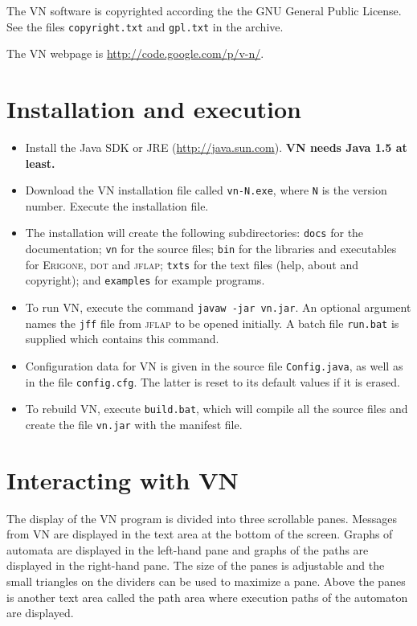 \documentclass[11pt]{article}
\newcommand{\vn}{\textsc{VN}}
\newcommand{\jf}{\textsc{jflap}}
\newcommand{\dt}{\textsc{dot}}
\newcommand{\erg}{\textsc{Erigone}}
\newcommand{\p}[1]{\texttt{#1}}
\begin{document}
The \vn{} software is copyrighted according the the GNU General Public License.
See the files \p{copyright.txt} and \p{gpl.txt} in the archive.

The \vn{} webpage is \url{http://code.google.com/p/v-n/}.

\section{Installation and execution}

\begin{itemize}
\item Install the Java SDK or JRE (\url{http://java.sun.com}).
\textbf{\vn{} needs Java 1.5 at least.}

\item Download the \vn{} installation file called \p{vn-N.exe},
where \p{N} is the version number.
Execute the installation file.

\item The installation will create the following subdirectories: \p{docs} for the
documentation; \p{vn} for the source files; \p{bin} for the libraries and executables
for \erg{}, \dt{} and \jf{}; \p{txts} for the text files
(help, about and copyright); and \p{examples} for example programs.

\item To run \vn{}, execute the command \p{javaw -jar vn.jar}.
An optional argument names the \p{jff} file from \jf{} to be opened initially.
A batch file \p{run.bat} is supplied which contains this command.

\item Configuration data for \vn{} is given in the source file \p{Config.java}, 
as well as in the file \p{config.cfg}. The latter is reset to its default values
if it is erased.

\item To rebuild \vn{}, execute \p{build.bat}, which will compile all the source
files and create the file \p{vn.jar} with the manifest file.
\end{itemize}

\section{Interacting with \vn{}}

The display of the \vn{} program is divided into three scrollable panes. 
Messages from \vn{} are displayed in the text area at the bottom of the screen.
Graphs of automata are displayed in the left-hand pane and graphs of the paths 
are displayed in the right-hand pane. The size of the panes is adjustable and 
the small triangles on the dividers can be used to maximize a pane.
Above the panes is another text area called the path area
where execution paths of the automaton are displayed.
\end{document}
